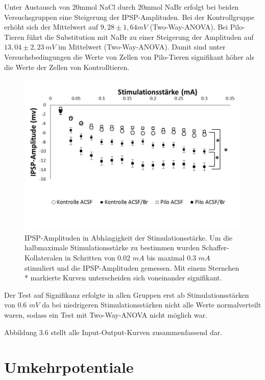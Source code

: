\documentclass[a4paper,11pt]{report}
\begin{document}
{Unter Austausch von 20mmol NaCl durch 20mmol NaBr erfolgt bei beiden Versuchsgruppen  eine Steigerung der IPSP-Amplituden. Bei der Kontrollgruppe erhöht sich der Mittelwert auf $9,28 \pm 1,64mV$ (Two-Way-ANOVA).
Bei Pilo-Tieren führt die Substitution mit NaBr zu einer Steigerung der Amplituden auf $13,04 \pm 2,23\, mV$ im Mittelwert (Two-Way-ANOVA). Damit sind unter Versuchsbedingungen die Werte von Zellen von Pilo-Tieren signifikant höher als die Werte der Zellen von Kontrolltieren. \\



\begin{figure}[H]
\begin{center}
\includegraphics[width=13cm]{Abbildungen/Inout_Diagramm.jpg}
\caption{IPSP-Amplituden in Abhängigkeit der Stimulationsstärke. Um die halbmaximale Stimulationsstärke zu bestimmen wurden Schaffer-Kollateralen in Schritten von $0.02$ $mA$ bis maximal $0.3$ $mA$ stimuliert und die IPSP-Amplituden gemessen. Mit einem Sternchen * markierte Kurven unterscheiden sich voneinander signifikant. }
\end{center}
\end{figure}

Der Test auf Signifikanz erfolgte in allen Gruppen erst ab Stimulationsstärken von $0.6$ $mV$ da bei niedrigeren Stimulationsstärken nicht alle Werte normalverteilt waren, sodass ein Test mit Two-Way-ANOVA nicht möglich war.

Abbildung 3.6 stellt alle Input-Output-Kurven zusammenfassend dar.

\section{Umkehrpotentiale}

}
\end{document}
